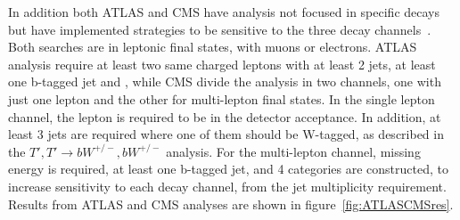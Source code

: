 In addition both ATLAS and CMS have analysis not focused in specific decays but have implemented strategies to be sensitive to the three decay channels~\cite{Aad:2015gdg,Chatrchyan:2013uxa}. Both searches are in leptonic final states, with muons or electrons. ATLAS analysis require at least two same charged leptons with at least 2 jets, at least one b-tagged jet and , while CMS divide the analysis in two channels, one with just one lepton and the other for multi-lepton final states. In the single lepton channel, the lepton is required to be in the detector acceptance. In addition, at least 3 jets are required where one of them should be W-tagged, as described in the ${T',T'\rightarrow bW^{+/-},bW^{+/-}}$ analysis. For the multi-lepton channel, missing energy is required, at least one b-tagged jet, and 4 categories are constructed, to increase sensitivity to each decay channel, from the jet multiplicity requirement. Results from ATLAS and CMS analyses are shown in figure~\ref{fig:ATLASCMSres}.
%

